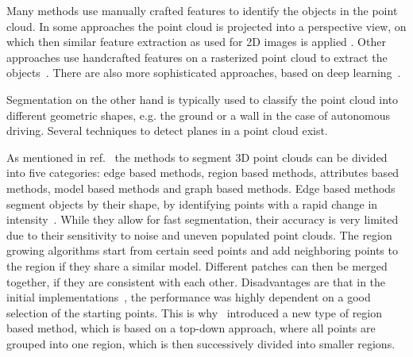 Many methods use manually crafted features to identify the objects in the point cloud.
In some approaches the point cloud is projected into a perspective view, on which then similar feature extraction as used for 2D images is applied
\cite{Premebida2014, Li2016}.
Other approaches use handcrafted features on a rasterized point cloud to extract the objects~\cite{Song2014, Song2016}.
There are also more sophisticated approaches, based on deep learning~\cite{Qi2017, Qi2017b, Zhuo2018}.

Segmentation on the other hand is typically used to classify the point cloud into different geometric shapes, e.g. the ground or a wall in the case of autonomous driving.
Several techniques to detect planes in a point cloud exist.

As mentioned in ref.~\cite{Nguyen2013} the methods to segment 3D point clouds can be divided into five categories: edge based methods, region based methods, attributes based methods, model based methods and graph based methods.
Edge based methods segment objects by their shape, by identifying points with a rapid change in intensity~\cite{Sappa2001}. While they allow for fast segmentation, their accuracy is very limited due to their sensitivity to noise and uneven populated point clouds.
The region growing algorithms start from certain seed points and add neighboring points to the region if they share a similar model.
Different patches can then be merged together, if they are consistent with each other.
Disadvantages are that in the initial implementations~\cite{Besl1988, Taubin1991}, the performance was highly dependent on a good selection of the starting points.
This is why~\cite{Chen2008} introduced a new type of region based method, which is based on a top-down approach, where all points are grouped into one region, which is then successively divided into smaller regions.

